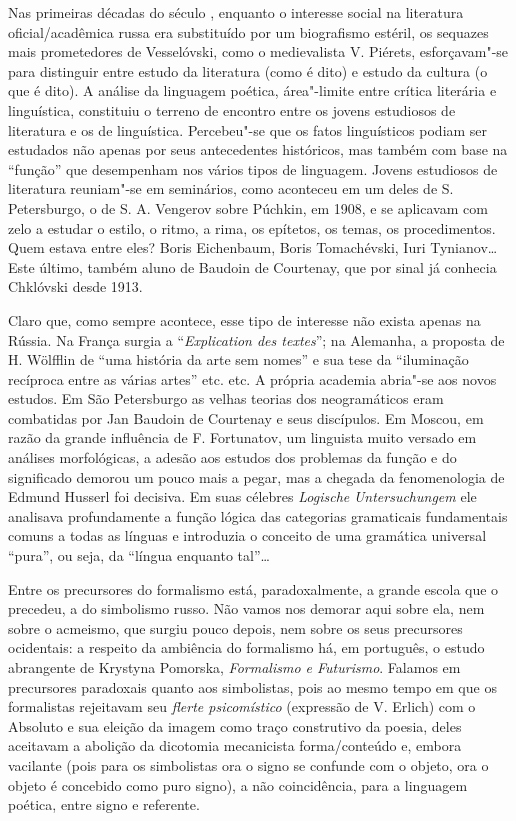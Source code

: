 Nas primeiras décadas do século , enquanto o interesse social na
literatura oficial/acadêmica russa era substituído por um biografismo
estéril, os sequazes mais prometedores de Vesselóvski, como o
medievalista V. Piérets, esforçavam"-se para distinguir entre estudo da
literatura (como é dito) e estudo da cultura (o que é dito). A análise
da linguagem poética, área"-limite entre crítica literária e linguística,
constituiu o terreno de encontro entre os jovens estudiosos de
literatura e os de linguística. Percebeu"-se que os fatos linguísticos
podiam ser estudados não apenas por seus antecedentes históricos, mas
também com base na ``função'' que desempenham nos vários tipos de
linguagem. Jovens estudiosos de literatura reuniam"-se em seminários,
como aconteceu em um deles de S. Petersburgo, o de S. A. Vengerov sobre
Púchkin, em 1908, e se aplicavam com zelo a estudar o estilo, o ritmo, a
rima, os epítetos, os temas, os procedimentos. Quem estava entre eles?
Boris Eichenbaum, Boris Tomachévski, Iuri Tynianov\ldots{} Este último,
também aluno de Baudoin de Courtenay, que por sinal já conhecia
Chklóvski desde 1913.

Claro que, como sempre acontece, esse tipo de interesse não exista
apenas na Rússia. Na França surgia a ``\emph{Explication des textes}'';
na Alemanha, a proposta de H. Wölfflin de ``uma história da arte sem
nomes'' e sua tese da ``iluminação recíproca entre as várias artes''
etc. etc. A própria academia abria"-se aos novos estudos. Em São
Petersburgo as velhas teorias dos neogramáticos eram combatidas por Jan
Baudoin de Courtenay e seus discípulos. Em Moscou, em razão da grande
influência de F. Fortunatov, um linguista muito versado em análises
morfológicas, a adesão aos estudos dos problemas da função e do
significado demorou um pouco mais a pegar, mas a chegada da
fenomenologia de Edmund Husserl foi decisiva. Em suas célebres
\emph{Logische} \emph{Untersuchungem} ele analisava profundamente a
função lógica das categorias gramaticais fundamentais comuns a todas as
línguas e introduzia o conceito de uma gramática universal ``pura'', ou
seja, da ``língua enquanto tal''\ldots{}

Entre os precursores do formalismo está, paradoxalmente, a grande escola
que o precedeu, a do simbolismo russo. Não vamos nos demorar aqui sobre
ela, nem sobre o acmeismo, que surgiu pouco depois, nem sobre os seus
precursores ocidentais: a respeito da ambiência do formalismo há, em
português, o estudo abrangente de Krystyna Pomorska, \emph{Formalismo e
Futurismo}. Falamos em precursores paradoxais quanto aos simbolistas,
pois ao mesmo tempo em que os formalistas rejeitavam seu \emph{flerte
psicomístico} (expressão de V. Erlich) com o Absoluto e sua eleição da
imagem como traço construtivo da poesia, deles aceitavam a abolição da
dicotomia mecanicista forma/conteúdo e, embora vacilante (pois para os
simbolistas ora o signo se confunde com o objeto, ora o objeto é
concebido como puro signo), a não coincidência, para a linguagem
poética, entre signo e referente.

